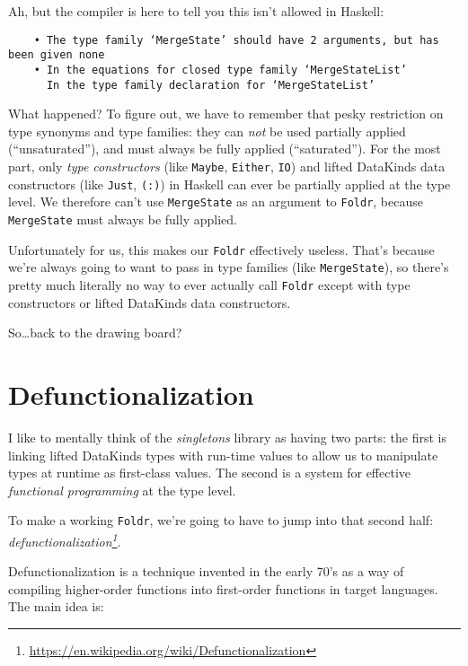 \documentclass[]{article}
\renewcommand{\href}[2]{#2\footnote{\url{#1}}}
\begin{document}
Ah, but the compiler is here to tell you this isn't allowed in Haskell:

\begin{verbatim}
    • The type family ‘MergeState’ should have 2 arguments, but has been given none
    • In the equations for closed type family ‘MergeStateList’
      In the type family declaration for ‘MergeStateList’
\end{verbatim}

What happened? To figure out, we have to remember that pesky restriction on type
synonyms and type families: they can \emph{not} be used partially applied
(``unsaturated''), and must always be fully applied (``saturated''). For the
most part, only \emph{type constructors} (like \texttt{Maybe}, \texttt{Either},
\texttt{IO}) and lifted DataKinds data constructors (like
\texttt{\textquotesingle{}Just}, \texttt{\textquotesingle{}(:)}) in Haskell can
ever be partially applied at the type level. We therefore can't use
\texttt{MergeState} as an argument to \texttt{Foldr}, because
\texttt{MergeState} must always be fully applied.

Unfortunately for us, this makes our \texttt{Foldr} effectively useless. That's
because we're always going to want to pass in type families (like
\texttt{MergeState}), so there's pretty much literally no way to ever actually
call \texttt{Foldr} except with type constructors or lifted DataKinds data
constructors.

So\ldots back to the drawing board?

\hypertarget{defunctionalization}{%
\section{Defunctionalization}\label{defunctionalization}}

I like to mentally think of the \emph{singletons} library as having two parts:
the first is linking lifted DataKinds types with run-time values to allow us to
manipulate types at runtime as first-class values. The second is a system for
effective \emph{functional programming} at the type level.

To make a working \texttt{Foldr}, we're going to have to jump into that second
half:
\emph{\href{https://en.wikipedia.org/wiki/Defunctionalization}{defunctionalization}}.

Defunctionalization is a technique invented in the early 70's as a way of
compiling higher-order functions into first-order functions in target languages.
The main idea is:
\end{document}
